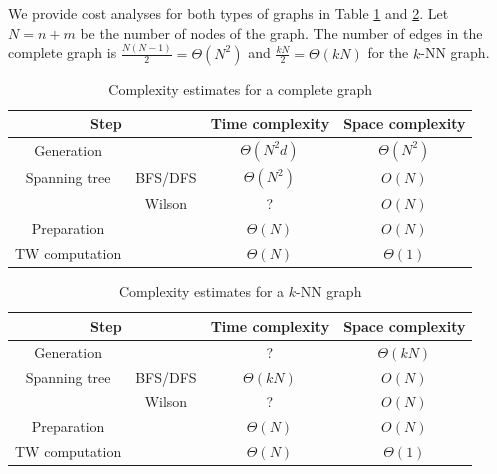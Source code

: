 \documentclass[12pt]{report}
\theoremstyle{definition}
\theoremstyle{remark}
\begin{document}
We provide cost analyses for both types of graphs in Table \ref{tab:2} and \ref{tab:3}. Let $N=n+m$ be the number of nodes of the graph. The number of edges in the complete graph is $\frac{N(N-1)}2=\Theta(N^2)$ and $\frac{kN}2=\Theta(kN)$ for the $k$-NN graph.

\begin{table}[H]
\centering
\begin{tabular}{|c|c|c|c|}
  \hline
    \multicolumn{2}{|c|}{Step} & Time complexity & Space complexity\\ \hline 
   Generation & & $\Theta(N^2d)$ & $\Theta(N^2)$\\
   Spanning tree & BFS/DFS & $\Theta(N^2)$ & $O(N)$ \\
    & Wilson & ? & $O(N)$ \\
    Preparation & & $\Theta(N)$ & $O(N)$\\
    TW computation & & $\Theta(N)$ & $\Theta(1)$\\
   \hline
\end{tabular}
\caption{Complexity estimates for a complete graph \label{tab:2}}
\end{table}

\begin{table}[H]
\centering
\begin{tabular}{|c|c|c|c|}
  \hline
    \multicolumn{2}{|c|}{Step} & Time complexity & Space complexity\\ \hline 
   Generation & & ? & $\Theta(kN)$\\
   Spanning tree & BFS/DFS & $\Theta(kN)$ & $O(N)$ \\
    & Wilson & ? & $O(N)$ \\
    Preparation & & $\Theta(N)$ & $O(N)$\\
    TW computation & & $\Theta(N)$ & $\Theta(1)$\\
   \hline
\end{tabular}
\caption{Complexity estimates for a $k$-NN graph \label{tab:3}}
\end{table}
\end{document}
